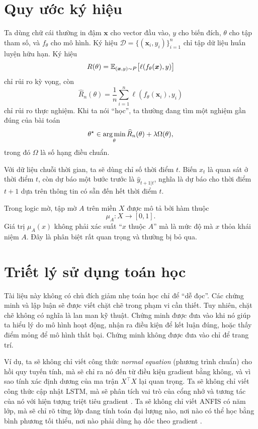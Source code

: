 \section*{Quy ước ký hiệu}

Ta dùng chữ cái thường in đậm $\bm{x}$ cho vector đầu vào, $y$ cho biến đích, $\theta$ cho tập tham số, và $f_\theta$ cho mô hình. Ký hiệu $\mathcal{D} = \{(\bm{x}_i,y_i)\}_{i=1}^n$ chỉ tập dữ liệu huấn luyện hữu hạn. Ký hiệu
\[
R(\theta) = \mathbb{E}_{(\bm{x},y)\sim P}\big[\ell(f_\theta(\bm{x}),y)\big]
\]
chỉ rủi ro kỳ vọng, còn
\[
\widehat{R}_n(\theta) = \frac{1}{n}\sum_{i=1}^n \ell(f_\theta(\bm{x}_i), y_i)
\]
chỉ rủi ro thực nghiệm. Khi ta nói ``học'', ta thường đang tìm một nghiệm gần đúng của bài toán
\[
\theta^\star \in \mathop{\mathrm{arg\,min}}_\theta \widehat{R}_n(\theta) + \lambda \Omega(\theta),
\]
trong đó $\Omega$ là số hạng điều chuẩn.

Với dữ liệu chuỗi thời gian, ta sẽ dùng chỉ số thời điểm $t$. Biến $x_t$ là quan sát ở thời điểm $t$, còn dự báo một bước trước là \(
\hat{y}_{t+1|t}
\), nghĩa là dự báo cho thời điểm $t+1$ dựa trên thông tin có sẵn đến hết thời điểm $t$.

Trong logic mờ, tập mờ $A$ trên miền $X$ được mô tả bởi hàm thuộc
\[
\mu_A : X \to [0,1].
\]
Giá trị $\mu_A(x)$ không phải xác suất ``$x$ thuộc $A$'' mà là mức độ mà $x$ thỏa khái niệm $A$. Đây là phân biệt rất quan trọng và thường bị bỏ qua.

\section*{Triết lý sử dụng toán học}

Tài liệu này không có chủ đích giảm nhẹ toán học chỉ để ``dễ đọc''. Các chứng minh và lập luận sẽ được viết chặt chẽ trong phạm vi cần thiết. Tuy nhiên, chặt chẽ không có nghĩa là lan man kỹ thuật. Chứng minh được đưa vào khi nó giúp ta hiểu lý do mô hình hoạt động, nhận ra điều kiện để kết luận đúng, hoặc thấy điểm mỏng để mô hình thất bại. Chứng minh không được đưa vào chỉ để trang trí.

Ví dụ, ta sẽ không chỉ viết công thức \emph{normal equation} (phương trình chuẩn) cho hồi quy tuyến tính, mà sẽ chỉ ra nó đến từ điều kiện gradient bằng không, và vì sao tính xác định dương của ma trận $X^\top X$ lại quan trọng. Ta sẽ không chỉ viết công thức cập nhật LSTM, mà sẽ phân tích vai trò của cổng nhớ và tương tác của nó với hiện tượng triệt tiêu gradient \citep{hochreiter1997lstm}. Ta sẽ không chỉ viết ANFIS có năm lớp, mà sẽ chỉ rõ từng lớp đang tính toán đại lượng nào, nơi nào có thể học bằng bình phương tối thiểu, nơi nào phải dùng hạ dốc theo gradient \citep{jang1993anfis}.

